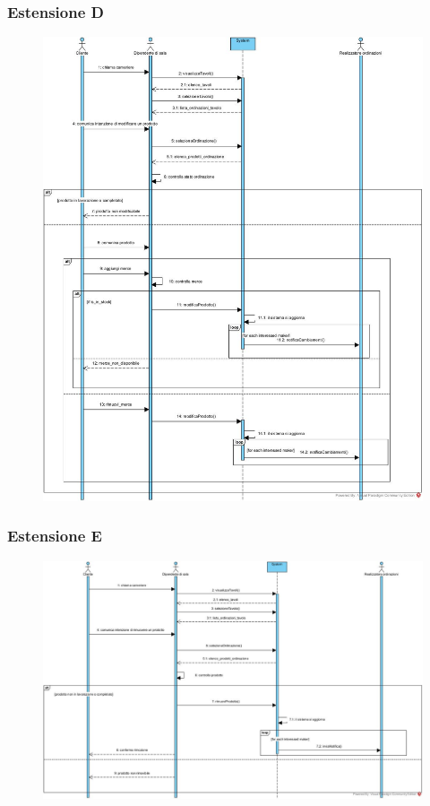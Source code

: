 \subsubsection{Estensione D}
\begin{figure}[H]
	\centering
	\includegraphics[width=1\textwidth]{Immagini/SSD Gestisci Ordinazione (EstensioneD - Modifica prodotto).jpg}
\end{figure}

\subsubsection{Estensione E}
\begin{figure}[H]
	\centering
	\includegraphics[width=1\textwidth]{Immagini/SSD Gestisci Ordinazioni (Estensione E - Rimuovi prodotto ordinazione).jpg}
\end{figure}

